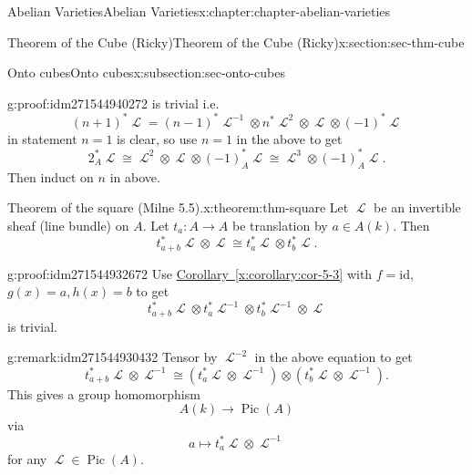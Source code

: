\documentclass[oneside,10pt,]{book}
\numberwithin{equation}{section}
\newcommand{\sheaf}[1]{\operatorname{\mathcal{#1}}}
\newcommand{\id}{\mathrm{id}}
\DeclareMathOperator{\Pic}{Pic}
\begin{document}
\begin{chapterptx}{Abelian Varieties}{}{Abelian Varieties}{}{}{x:chapter:chapter-abelian-varieties}
\begin{sectionptx}{Theorem of the Cube (Ricky)}{}{Theorem of the Cube (Ricky)}{}{}{x:section:sec-thm-cube}
\begin{subsectionptx}{Onto cubes}{}{Onto cubes}{}{}{x:subsection:sec-onto-cubes}
\begin{proofptx}{}{g:proof:idm271544940272}
is trivial i.e.%
\begin{equation*}
(n+1)^*\sheaf L =  (n-1)^*\sheaf L^{-1}\otimes n^*\sheaf L^2 \otimes   \sheaf L \otimes   (-1)^*\sheaf L
\end{equation*}
in statement \(n = 1\) is clear, so use \(n=1\) in the above to get%
\begin{equation*}
2_A^*\sheaf L \cong \sheaf L^2 \otimes \sheaf L \otimes (-1)^*_A \sheaf L\cong \sheaf L^3 \otimes (-1)_A^*\sheaf  L\text{.}
\end{equation*}
Then induct on \(n\) in above.%
\end{proofptx}
\begin{theorem}{Theorem of the square (Milne 5.5).}{}{x:theorem:thm-square}%
Let \(\sheaf L\) be an invertible sheaf (line bundle) on \(A\). Let \(t_a \colon A\to A\) be translation by \(a\in A(k)\). Then%
\begin{equation*}
t_{a+b}^*\sheaf L \otimes \sheaf L \cong t_a^*\sheaf L \otimes t_b^* \sheaf L\text{.}
\end{equation*}
%
\end{theorem}
\begin{proofptx}{}{g:proof:idm271544932672}
Use \hyperref[x:corollary:cor-5-3]{Corollary~\ref{x:corollary:cor-5-3}} with \(f=  \id\), \(g(x)  = a, h(x) = b\) to get%
\begin{equation*}
t_{a+b}^*\sheaf L \otimes t_{a}^*\sheaf L ^{-1}\otimes t_b^* \sheaf L ^{-1} \otimes \sheaf L
\end{equation*}
is trivial.%
\end{proofptx}
\begin{remark}{}{g:remark:idm271544930432}%
Tensor by \(\sheaf L^{-2}\) in the above equation to get%
\begin{equation*}
t_{a+b}^*\sheaf L \otimes\sheaf L^{-1} \cong ( t_{a}^*\sheaf L \otimes \sheaf L^{-1}) \otimes(t_b^* \sheaf L\otimes \sheaf L^{-1})\text{.}
\end{equation*}
This gives a group homomorphism%
\begin{equation*}
A(k) \to \Pic(A)
\end{equation*}
via%
\begin{equation*}
a\mapsto t_a^*\sheaf L \otimes \sheaf L^{-1}
\end{equation*}
for any \(\sheaf L \in \Pic(A)\).%
\end{remark}
\end{subsectionptx}
\end{sectionptx}
%
%
\typeout{************************************************}

\end{chapterptx}
\end{document}
